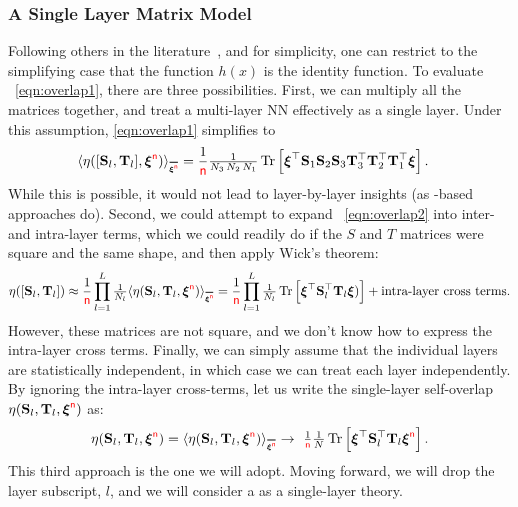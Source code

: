 \subsubsection{A Single Layer Matrix Model}
Following others in the literature~\cite{SMG2013_TR}, and for simplicity, one can restrict to the simplifying case that the function $h(x)$ is the identity function.
To evaluate \EQN~\ref{eqn:overlap1}, there are three possibilities.
First, we can multiply all the matrices together, and treat a multi-layer NN effectively as a single layer.
Under this assumption, \EQN \ref{eqn:overlap1} simplifies to
%
\begin{align}
\label{eqn:overlap2}
  \ETAMLPAVG &= \frac{1}{\ND}\tfrac{1}{N_3 \, N_2 \, N_1} 
  \Trace{ \boldsymbol{\xi}^\top 
    \SMAT_1 \SMAT_2 \SMAT_3 
    \TMAT_3^{\top} \TMAT_2^{\top} \TMAT_1^{\top} 
    \boldsymbol{\xi} }.
\end{align}
While this is possible, it would not lead to layer-by-layer insights (as \HTSR-based approaches do).
%
Second, we could attempt to expand \EQN~\ref{eqn:overlap2} into inter- and intra-layer terms, 
which we could readily do if the $S$ and $T$ matrices were square and the same shape, and then apply Wick's theorem:
\begin{align}
\ETAMLP\approx\frac{1}{\ND}\prod_{l=1}^{L}\tfrac{1}{N_l}\ETAMATAVG=
\frac{1}{\ND}\prod_{l=1}^{L}\tfrac{1}{N_l}\Trace{ \XI^{\top} \SMAT^{\top}_{l} \TMAT_{l} \XI) } +\text{intra-layer cross terms}.
\end{align}
However, these matrices are not square, and we don't know how to express the intra-layer cross terms.
%
Finally, we can simply assume that the individual layers are statistically independent, in which case we can treat each layer independently.
By ignoring the intra-layer cross-terms, let us write the single-layer self-overlap $\eta({\mathbf{S}}_l,{\mathbf{T}}_l,\boldsymbol{\xi}^{{\color{red}\sf{n}}})$ as:
\begin{align}
  \label{eqn:eta}
  \ETAMAT =
        \ETAMATAVG\rightarrow \
        \tfrac{1}{\ND}\tfrac{1}{N} \Trace{ \XI^{\top} \SMAT^{\top}_{l} \TMAT_{l} \NDXI }  .
\end{align}
This third approach is the one we will adopt.
Moving forward, we will drop the layer subscript, $l$, and we will consider a \SETOL as a single-layer theory.


